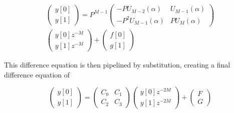 \documentclass{IEEEtran}
\newcommand{\chebyu}[2]{U_{#1}\left(#2\right)}
\newcommand{\ssrsample}[2]{#1\left[#2\right]}
\begin{document}
\begin{multline*}
    \begin{pmatrix}
        \ssrsample{y}{0} \\
        \ssrsample{y}{1}
    \end{pmatrix}
    =
    P^{M-1}
    \begin{pmatrix}
        -P\chebyu{M-2}{\alpha} & \chebyu{M-1}{\alpha} \\
        -P^{2}\chebyu{M-1}{\alpha} & P\chebyu{M}{\alpha}
    \end{pmatrix}
    \\
    \begin{pmatrix}
        \ssrsample{y}{0}z^{-M} \\
        \ssrsample{y}{1}z^{-M}
    \end{pmatrix}
    +
    \begin{pmatrix}
        \ssrsample{f}{0} \\
        \ssrsample{g}{1}
    \end{pmatrix}
\end{multline*}

This difference equation is then pipelined by substitution, 
creating a final difference equation of

\begin{equation}
\label{eq:finaldifference}
    \begin{pmatrix}
        \ssrsample{y}{0} \\
        \ssrsample{y}{1}
    \end{pmatrix}
    =
    \begin{pmatrix}
        C_0 & C_1 \\
        C_2 & C_3
    \end{pmatrix}
    \begin{pmatrix}
        \ssrsample{y}{0}z^{-2M} \\
        \ssrsample{y}{1}z^{-2M}
    \end{pmatrix}
    +
    \begin{pmatrix}
        F \\
        G
    \end{pmatrix}
\end{equation}
\end{document}
